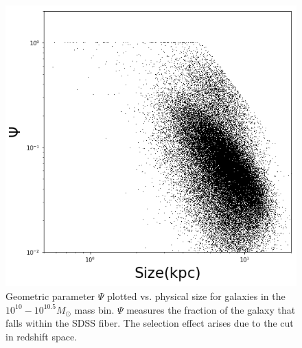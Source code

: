 \documentclass[iop]{emulateapj}
\begin{document}
\begin{figure}
	\centering
	\includegraphics[width=1 \columnwidth]{geometry_9_5.png}
	\caption{Geometric parameter $\Psi$ plotted vs. physical size for galaxies in the $10^{10} - 10^{10.5} M_{\odot}$ mass bin. $\Psi$ measures the fraction of the galaxy that falls within the SDSS fiber. The selection effect arises due to the cut in redshift space.}
     \label{fig:geo}

\end{figure}
\end{document}
